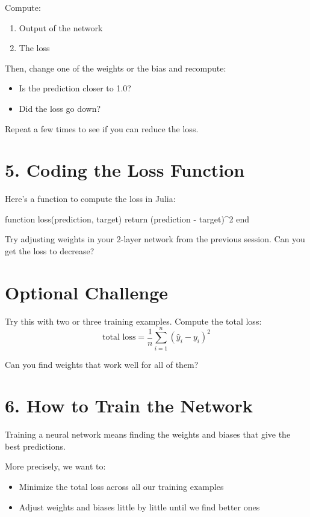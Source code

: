 \documentclass{book}
\begin{document}
Compute:
\begin{enumerate}
  \item Output of the network
  \item The loss
\end{enumerate}

Then, change one of the weights or the bias and recompute:
\begin{itemize}
  \item Is the prediction closer to 1.0?
  \item Did the loss go down?
\end{itemize}

Repeat a few times to see if you can reduce the loss.

\section*{5. Coding the Loss Function}
Here’s a function to compute the loss in Julia:
\begin{julia}
function loss(prediction, target)
    return (prediction - target)^2
end
\end{julia}

Try adjusting weights in your 2-layer network from the previous session. Can you get the loss to decrease?

\section*{Optional Challenge}
Try this with two or three training examples. Compute the total loss:
\[
\text{total loss} = \frac{1}{n} \sum_{i=1}^{n} (\hat{y}_i - y_i)^2
\]

Can you find weights that work well for all of them?


\section*{6. How to Train the Network}

Training a neural network means finding the weights and biases that give the best predictions.

More precisely, we want to:
\begin{itemize}
  \item Minimize the total loss across all our training examples
  \item Adjust weights and biases little by little until we find better ones
\end{itemize}
\end{document}
